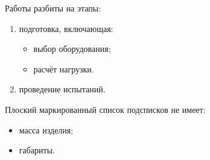 Работы разбиты на этапы:

\begin{enumerate}
  \item[а)] подготовка, включающая:
    \begin{itemize}
      \item выбор оборудования;
      \item расчёт нагрузки.
    \end{itemize}
  \item[б)] проведение испытаний.
\end{enumerate}

Плоский маркированный список подсписков не имеет:

\begin{itemize}
  \item масса изделия;
  \item габариты.
\end{itemize}
